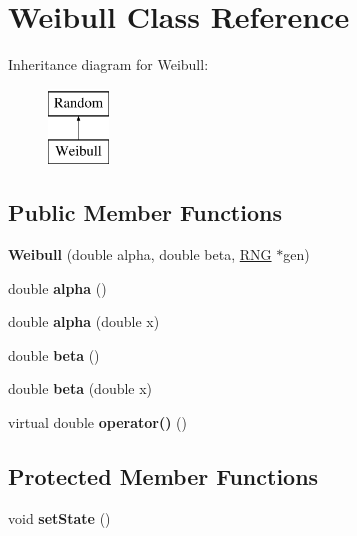 \hypertarget{classWeibull}{}\section{Weibull Class Reference}
\label{classWeibull}
Inheritance diagram for Weibull\+:\begin{figure}[H]
\begin{center}
\leavevmode
\includegraphics[height=2.000000cm]{classWeibull}
\end{center}
\end{figure}
\subsection*{Public Member Functions}
\begin{DoxyCompactItemize}
\item 
\mbox{\label{classWeibull_ad94a4318d7653eab97acac37eecbedbc}} 
{\bfseries Weibull} (double alpha, double beta, \hyperlink{classRNG}{R\+NG} $\ast$gen)
\item 
\mbox{\label{classWeibull_a7fa9e6b35594d01d81e33d9684d2f4c9}} 
double {\bfseries alpha} ()
\item 
\mbox{\label{classWeibull_a4ab0dfb00685e5068887f65baa63185e}} 
double {\bfseries alpha} (double x)
\item 
\mbox{\label{classWeibull_ad5b7bb62fac00eca0f8da870c329fc6b}} 
double {\bfseries beta} ()
\item 
\mbox{\label{classWeibull_a9758e171372d29c252c6416dddaf685c}} 
double {\bfseries beta} (double x)
\item 
\mbox{\label{classWeibull_adc68cf3a94651222791f799382cca788}} 
virtual double {\bfseries operator()} ()
\end{DoxyCompactItemize}
\subsection*{Protected Member Functions}
\begin{DoxyCompactItemize}
\item 
\mbox{\label{classWeibull_a3955213622109334a36335d9b01e1bab}} 
void {\bfseries set\+State} ()
\end{DoxyCompactItemize}
